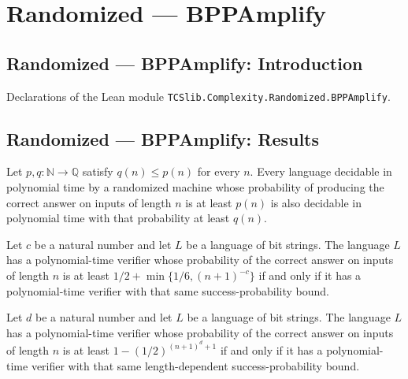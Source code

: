 \section{Randomized --- BPPAmplify}
\subsection*{Randomized --- BPPAmplify: Introduction}

Declarations of the Lean module \texttt{TCSlib.Complexity.Randomized.BPPAmplify}.

\subsection*{Randomized --- BPPAmplify: Results}

\begin{theorem}
\label{Randomized.BPP_PTMWith_mono}
\leanok
{}
Let $p,q:\mathbb{N}\to\mathbb{Q}$ satisfy $q(n)\leq p(n)$ for every $n$. Every language
decidable in polynomial time by a randomized machine whose probability of producing the
correct answer on inputs of length $n$ is at least $p(n)$ is also decidable in
polynomial time with that probability at least $q(n)$.
\end{theorem}

\begin{theorem}
\label{Randomized.inBPPWith_iff_inBPPWeak}
\leanok
{}
Let $c$ be a natural number and let $L$ be a language of bit strings. The language $L$
has a polynomial-time verifier whose probability of the correct answer on inputs of
length $n$ is at least $1/2+\min\{1/6,(n+1)^{-c}\}$ if and only if it has a
polynomial-time verifier with that same success-probability bound.
\end{theorem}

\begin{theorem}
\label{Randomized.inBPPWith_iff_inBPPStrong}
\leanok
{}
Let $d$ be a natural number and let $L$ be a language of bit strings. The language $L$
has a polynomial-time verifier whose probability of the correct answer on inputs of
length $n$ is at least $1-(1/2)^{(n+1)^d+1}$ if and only if it has a polynomial-time
verifier with that same length-dependent success-probability bound.
\end{theorem}

